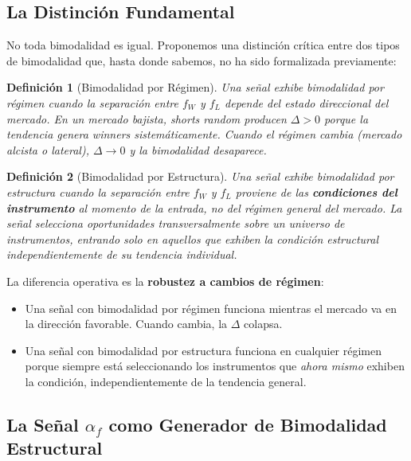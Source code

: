 \documentclass[11pt,a4paper]{article}
\newtheorem{definition}{Definici\'on}[section]
\newcommand{\af}{\alpha_f}
\begin{document}
\subsection{La Distinci\'on Fundamental}

No toda bimodalidad es igual. Proponemos una distinci\'on cr\'itica
entre dos tipos de bimodalidad que, hasta donde sabemos, no ha sido
formalizada previamente:

\begin{definition}[Bimodalidad por R\'egimen]
\label{def:regime_bimodal}
Una se\~nal exhibe bimodalidad por r\'egimen cuando la separaci\'on
entre $f_W$ y $f_L$ depende del estado direccional del mercado.
En un mercado bajista, shorts random producen $\Delta > 0$ porque
la tendencia genera winners sistem\'aticamente. Cuando el r\'egimen
cambia (mercado alcista o lateral), $\Delta \to 0$ y la bimodalidad
desaparece.
\end{definition}

\begin{definition}[Bimodalidad por Estructura]
\label{def:struct_bimodal}
Una se\~nal exhibe bimodalidad por estructura cuando la separaci\'on
entre $f_W$ y $f_L$ proviene de las \textbf{condiciones del instrumento}
al momento de la entrada, no del r\'egimen general del mercado.
La se\~nal selecciona oportunidades transversalmente sobre un universo
de instrumentos, entrando solo en aquellos que exhiben la condici\'on
estructural independientemente de su tendencia individual.
\end{definition}

La diferencia operativa es la \textbf{robustez a cambios de r\'egimen}:

\begin{itemize}[leftmargin=1.5em]
\item Una se\~nal con bimodalidad por r\'egimen funciona mientras el
  mercado va en la direcci\'on favorable. Cuando cambia, la $\Delta$
  colapsa.
\item Una se\~nal con bimodalidad por estructura funciona en cualquier
  r\'egimen porque siempre est\'a seleccionando los instrumentos que
  \textit{ahora mismo} exhiben la condici\'on, independientemente de
  la tendencia general.
\end{itemize}


\subsection{La Se\~nal $\af$ como Generador de Bimodalidad Estructural}
\end{document}
